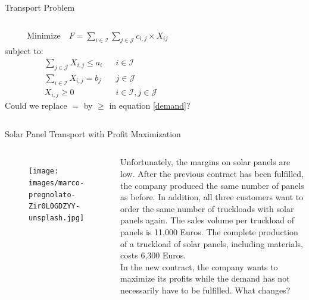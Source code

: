 \documentclass[aspectratio=1610,12pt]{beamer}
\begin{document}
\begin{frame}{Transport Problem}
	\begin{columns}[onlytextwidth]
			\begin{align}
				\text{Minimize} \quad F = \sum_{i \in \mathcal{I}} \sum_{j \in \mathcal{J}} c_{i,j} \times X_{ij}
			\end{align}
			subject to:
			\begin{align}
    			&\sum_{j \in \mathcal{J}} X_{i,j} \leq {a_i} && i \in \mathcal{I} \label{offer} \\
    			&\sum_{i \in \mathcal{I}} X_{i,j} = {b_j} && j \in \mathcal{J} \label{demand} \\
    			& X_{i,j}       \geq {0}     && i \in \mathcal{I}, j \in \mathcal{J}
			\end{align}
            \pause
            \center Could we replace $=$ by $\geq$ in equation \eqref{demand}?
	\end{columns}
\end{frame}

\begin{frame}[fragile]{Solar Panel Transport with Profit Maximization}
    \label{pic_pregnolato}
	\begin{columns}[onlytextwidth]
    	\center
    		\begin{figure}
    			\texttt{[image: images/marco-pregnolato-Zir0L0GDZYY-unsplash.jpg]}
       		\end{figure}
    		Unfortunately, the margins on solar panels are low. After the previous contract has been fulfilled, the company produced the same number of panels as before. In addition, all three customers want to order the same number of truckloads with solar panels again. The sales volume per truckload of panels is 11,000 Euros. The complete production of a truckload of solar panels, including materials, costs 6,300 Euros.\\
    		
    		In the new contract, the company wants to maximize its profits while the demand has not necessarily have to be fulfilled. What changes?
    \end{columns}
\end{frame}
\end{document}
